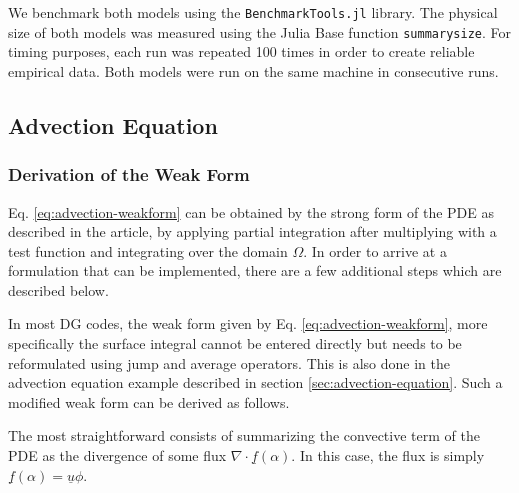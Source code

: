 \documentclass[sn-mathphys,Numbered]{sn-jnl}%
\theoremstyle{thmstyleone}%
\theoremstyle{thmstyletwo}%
\theoremstyle{thmstylethree}%
\begin{document}
\begin{appendices}
We benchmark both models using the \texttt{BenchmarkTools.jl} library.
The physical size of both models was measured using the Julia Base function \texttt{summarysize}.
For timing purposes, each run was repeated 100 times in order to create reliable empirical data.
Both models were run on the same machine in consecutive runs.

\subsection{Advection Equation}

\subsubsection{Derivation of the Weak Form}

Eq. \ref{eq:advection-weakform} can be obtained by the strong form of the PDE as described in the article, by applying partial integration after multiplying with a test function and integrating over the domain $\Omega$.
In order to arrive at a formulation that can be implemented, there are a few additional steps which are described below.

In most DG codes, the weak form given by Eq. \ref{eq:advection-weakform}, more specifically the surface integral cannot be entered directly but needs to be reformulated using jump and average operators.
This is also done in the advection equation example described in section \ref{sec:advection-equation}.
Such a modified weak form can be derived as follows.

The most straightforward consists of summarizing the convective term of the PDE as the divergence of some flux $\nabla \cdot \underline{f}(\alpha)$.
In this case, the flux is simply $\underline{f}(\alpha) = \underline{u} \phi$.


\end{appendices}
\end{document}
